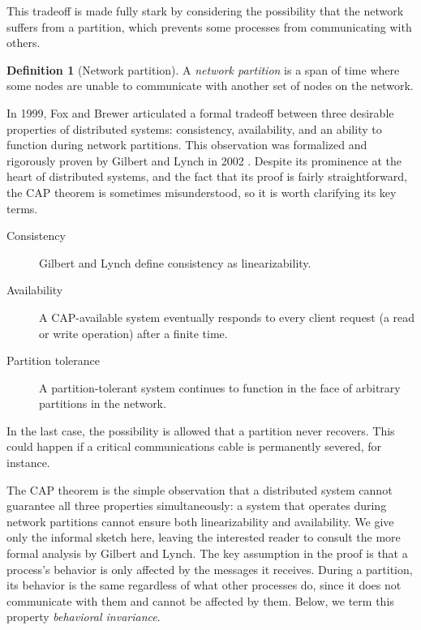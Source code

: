 \documentclass[]             %
{NASA}                       %
\theoremstyle{definition}
\newtheorem{definition}[theorem]{Definition}
\begin{document}
This tradeoff is made fully stark by considering the possibility that
the network suffers from a partition, which prevents some processes
from communicating with others.

\begin{definition}[Network partition] A \emph{network partition} is a
span of time where some nodes are unable to communicate with another
set of nodes on the network.
\end{definition}

In 1999, Fox and Brewer \cite{1999foxbrewer} articulated a formal
tradeoff between three desirable properties of distributed systems:
consistency, availability, and an ability to function during network
partitions. This observation was formalized and rigorously proven by
Gilbert and Lynch in 2002 \cite{2002gilbertlynchCAP}. Despite its
prominence at the heart of distributed systems, and the fact that its
proof is fairly straightforward, the CAP theorem is sometimes
misunderstood, so it is worth clarifying its key terms.

\begin{description}
\item[Consistency] Gilbert and Lynch define consistency as
  linearizability.
\item[Availability] A CAP-available system eventually responds to every client
  request (a read or write operation) after a finite time.
\item[Partition tolerance] A partition-tolerant system continues to
  function in the face of arbitrary partitions in the network.
\end{description}

In the last case, the possibility is allowed that a partition never
recovers. This could happen if a critical communications cable is
permanently severed, for instance.

The CAP theorem is the simple observation that a distributed system
cannot guarantee all three properties simultaneously: a system that
operates during network partitions cannot ensure both linearizability
and availability. We give only the informal sketch here, leaving the
interested reader to consult the more formal analysis by Gilbert and
Lynch. The key assumption in the proof is that a process's behavior is
only affected by the messages it receives. During a partition, its
behavior is the same regardless of what other processes do, since it
does not communicate with them and cannot be affected by them. Below,
we term this property \emph{behavioral invariance}.
\end{document}
